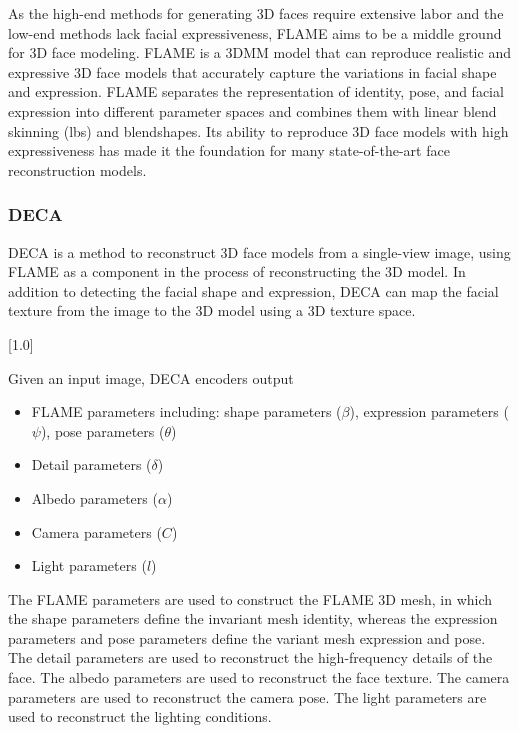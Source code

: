 As the high-end methods for generating 3D faces require extensive labor and the low-end methods lack facial expressiveness, FLAME \cite{liLearningModelFacial2017} aims to be a middle ground for 3D face modeling. FLAME is a 3DMM model that can reproduce realistic and expressive 3D face models that accurately capture the variations in facial shape and expression. FLAME separates the representation of identity, pose, and facial expression into different parameter spaces and combines them with linear blend skinning (\acrshort{lbs}) and blendshapes. Its ability to reproduce 3D face models with high expressiveness has made it the foundation for many state-of-the-art face reconstruction models.


\subsubsection{DECA}

DECA \cite{fengLearningAnimatableDetailed2021} is a method to reconstruct 3D face models from a single-view image, using FLAME as a component in the process of reconstructing the 3D model. In addition to detecting the facial shape and expression, DECA can map the facial texture from the image to the 3D model using a 3D texture space.

[1.0]

Given an input image, DECA encoders output
\begin{itemize}
    \item FLAME parameters including: shape parameters ($\beta$), expression parameters ($\psi$), pose parameters ($\theta$)
    \item Detail parameters ($\delta $)
    \item Albedo parameters ($\alpha$)
    \item Camera parameters ($C$)
    \item Light parameters ($l$)
\end{itemize}

The FLAME parameters are used to construct the FLAME 3D mesh, in which the shape parameters define the invariant mesh identity, whereas the expression parameters and pose parameters define the variant mesh expression and pose. The detail parameters are used to reconstruct the high-frequency details of the face. The albedo parameters are used to reconstruct the face texture. The camera parameters are used to reconstruct the camera pose. The light parameters are used to reconstruct the lighting conditions.

